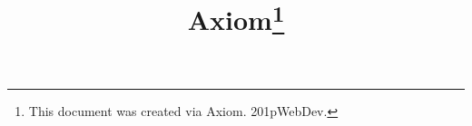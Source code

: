 \documentclass[paper=a4, fontsize=11pt]{article} %
\begin{document}
\title{Axiom\thanks{This document was created via Axiom. 201pWebDev.}}

\maketitle
\end{document}
